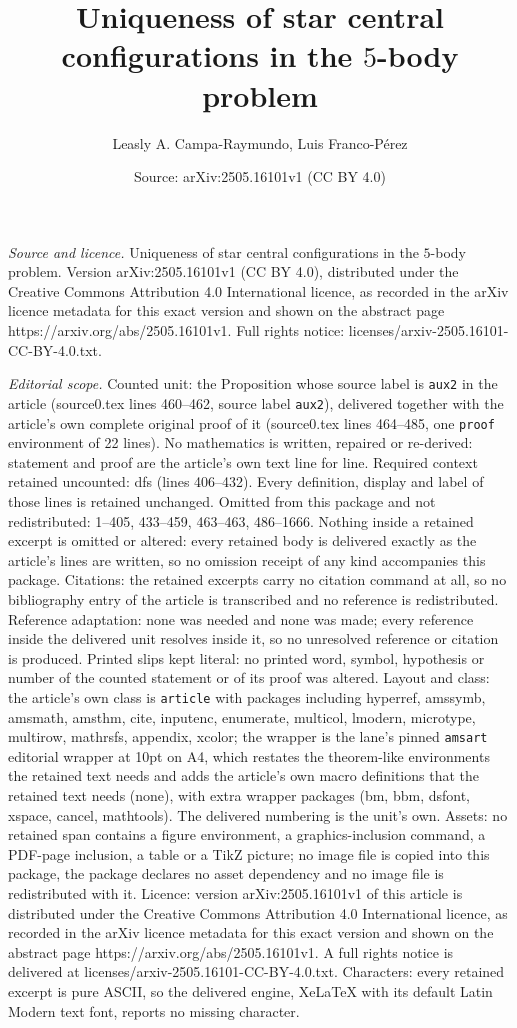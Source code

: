 \documentclass[10pt,a4paper]{amsart}
\title[Uniqueness of star central configurations in the $5$-body pr]{Uniqueness of star central configurations in the $5$-body problem}
\author{Leasly A. Campa-Raymundo, Luis Franco-P\'erez}
\date{Source: arXiv:2505.16101v1 (CC BY 4.0)}
\begin{document}
\maketitle

\noindent\emph{Source and licence.} Uniqueness of star central configurations in the $5$-body problem. Version arXiv:2505.16101v1 (CC BY 4.0), distributed under the Creative Commons Attribution 4.0 International licence, as recorded in the arXiv licence metadata for this exact version and shown on the abstract page https://arxiv.org/abs/2505.16101v1. Full rights notice: licenses/arxiv-2505.16101-CC-BY-4.0.txt.\par\smallskip

\noindent\textit{Editorial scope.} Counted unit: the Proposition whose source label is \texttt{aux2} in the article (source0.tex lines 460--462, source label \texttt{aux2}), delivered together with the article's own complete original proof of it (source0.tex lines 464--485, one \texttt{proof} environment of 22 lines). No mathematics is written, repaired or re-derived: statement and proof are the article's own text line for line. Required context retained uncounted: dfs (lines 406--432). Every definition, display and label of those lines is retained unchanged. Omitted from this package and not redistributed: 1--405, 433--459, 463--463, 486--1666. Nothing inside a retained excerpt is omitted or altered: every retained body is delivered exactly as the article's lines are written, so no omission receipt of any kind accompanies this package. Citations: the retained excerpts carry no citation command at all, so no bibliography entry of the article is transcribed and no reference is redistributed. Reference adaptation: none was needed and none was made; every reference inside the delivered unit resolves inside it, so no unresolved reference or citation is produced. Printed slips kept literal: no printed word, symbol, hypothesis or number of the counted statement or of its proof was altered. Layout and class: the article's own class is \texttt{article} with packages including hyperref, amssymb, amsmath, amsthm, cite, inputenc, enumerate, multicol, lmodern, microtype, multirow, mathrsfs, appendix, xcolor; the wrapper is the lane's pinned \texttt{amsart} editorial wrapper at 10pt on A4, which restates the theorem-like environments the retained text needs and adds the article's own macro definitions that the retained text needs (none), with extra wrapper packages (bm, bbm, dsfont, xspace, cancel, mathtools). The delivered numbering is the unit's own. Assets: no retained span contains a figure environment, a graphics-inclusion command, a PDF-page inclusion, a table or a TikZ picture; no image file is copied into this package, the package declares no asset dependency and no image file is redistributed with it. Licence: version arXiv:2505.16101v1 of this article is distributed under the Creative Commons Attribution 4.0 International licence, as recorded in the arXiv licence metadata for this exact version and shown on the abstract page https://arxiv.org/abs/2505.16101v1. A full rights notice is delivered at licenses/arxiv-2505.16101-CC-BY-4.0.txt. Characters: every retained excerpt is pure ASCII, so the delivered engine, XeLaTeX with its default Latin Modern text font, reports no missing character.
\end{document}

